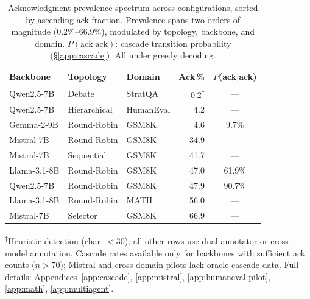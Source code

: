 
\begin{table}[t]
\centering
\caption{Acknowledgment prevalence spectrum across configurations, sorted by ascending ack fraction. Prevalence spans two orders of magnitude (0.2\%--66.9\%), modulated by topology, backbone, and domain. $P(\text{ack}|\text{ack})$: cascade transition probability (\S\ref{app:cascade}). All under greedy decoding.}
\label{tab:topology_ack}
\small
\begin{tabular}{@{}lllrc@{}}
\toprule
\textbf{Backbone} & \textbf{Topology} & \textbf{Domain} & \textbf{Ack\,\%} & $P$\textbf{(ack$|$ack)} \\
\midrule
Qwen2.5-7B & Debate & StratQA & 0.2\textsuperscript{$\dagger$} & --- \\
Qwen2.5-7B & Hierarchical & HumanEval & 4.2 & --- \\
Gemma-2-9B & Round-Robin & GSM8K & 4.6 & 9.7\% \\
Mistral-7B & Round-Robin & GSM8K & 34.9 & --- \\
Mistral-7B & Sequential & GSM8K & 41.7 & --- \\
Llama-3.1-8B & Round-Robin & GSM8K & 47.0 & 61.9\% \\
Qwen2.5-7B & Round-Robin & GSM8K & 47.9 & 90.7\% \\
Llama-3.1-8B & Round-Robin & MATH & 56.0 & --- \\
Mistral-7B & Selector & GSM8K & 66.9 & --- \\
\bottomrule
\end{tabular}
\vspace{1mm}

\raggedright\footnotesize \textsuperscript{$\dagger$}Heuristic detection (char~$< 30$); all other rows use dual-annotator or cross-model annotation. Cascade rates available only for backbones with sufficient ack counts ($n > 70$); Mistral and cross-domain pilots lack oracle cascade data. Full details: Appendices~\ref{app:cascade}, \ref{app:mistral}, \ref{app:humaneval-pilot}, \ref{app:math}, \ref{app:multiagent}.
\end{table}
